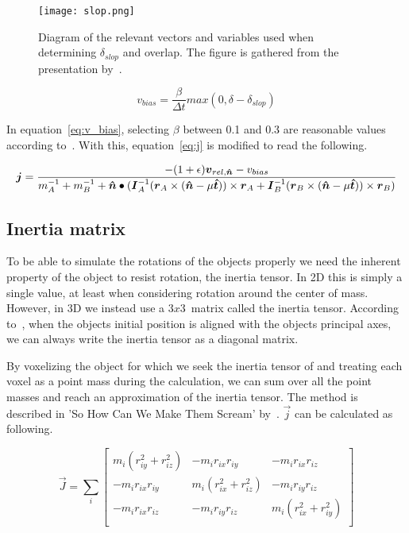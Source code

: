 \begin{figure}[H]
  \centering
  \texttt{[image: slop.png]}
  \caption{Diagram of the relevant vectors and variables used when determining $\delta_{slop}$ and
  overlap. The figure is gathered from the presentation by~\cite{catto2006}.}
  \label{fig:slop}
\end{figure}

\begin{equation}\label{eq:v_bias}
  v_{bias} = \frac{\beta}{\Delta t}max(0, \delta-\delta_{slop})
\end{equation}

In equation~\ref{eq:v_bias}, selecting $\beta$ between 0.1 and 0.3 are reasonable values according to~\cite{catto2006}.
With this, equation~\ref{eq:j} is modified to read the following.

\begin{equation}\label{eq:finalJ}
  \boldsymbol{j} = \frac{-(1+\epsilon)\boldsymbol{v}_{rel,\boldsymbol{\hat{n}}}-v_{bias}}
  {m_A^{-1}+m_B^{-1}+\boldsymbol{\hat{n}}\bullet(\boldsymbol{I}_A^{-1}(\boldsymbol{r}_A\times(\boldsymbol{\hat{n}}-\mu\boldsymbol{\hat{t}}))\times\boldsymbol{r}_A
  +\boldsymbol{I}_B^{-1}(\boldsymbol{r}_B\times(\boldsymbol{\hat{n}}-\mu\boldsymbol{\hat{t}}))\times\boldsymbol{r}_B)}
\end{equation}

\subsection{Inertia matrix}
To be able to simulate the rotations of the objects properly we need the inherent
property of the object to resist rotation, the inertia tensor.
In 2D this is simply a single value, at least when considering rotation around
the center of mass. However, in 3D we instead use a $3x3$ matrix called the
inertia tensor. According to~\cite{ragnemalmscream}, when the objects initial
position is aligned with the objects principal axes, we can always write the inertia tensor
as a diagonal matrix.

By voxelizing the object for which we seek the inertia tensor of and treating each voxel
as a point mass during the calculation, we can sum over all the point masses and reach
an approximation of the inertia tensor. The method is described in
 'So How Can We Make Them Scream' by~\cite{ragnemalmscream}.
$\vec{j}$ can be calculated as following.

 \begin{equation}
  \vec{J} = \sum_i
  \begin{bmatrix}
    m_i(r_{iy}^2 + r_{iz}^2) & -m_ir_{ix}r_{iy} & -m_ir_{ix}r_{iz} \\
    -m_ir_{ix}r_{iy} & m_i(r_{ix}^2 + r_{iz}^2) & -m_ir_{iy}r_{iz} \\
    -m_ir_{ix}r_{iz} & -m_ir_{iy}r_{iz} & m_i(r_{ix}^2 + r_{iy}^2) \\
  \end{bmatrix}
 \end{equation}

